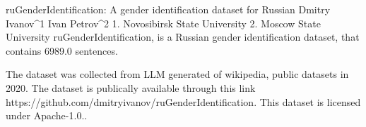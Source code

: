 
ruGenderIdentification: A gender identification dataset for Russian
Dmitry Ivanov^1 Ivan Petrov^2
1. Novosibirsk State University 2. Moscow State University
ruGenderIdentification, is a Russian gender identification dataset, that contains 6989.0 sentences.

The dataset was collected from LLM generated of wikipedia, public datasets in 2020. 
The dataset is publically available through this link https://github.com/dmitryivanov/ruGenderIdentification. This dataset is licensed under Apache-1.0..

